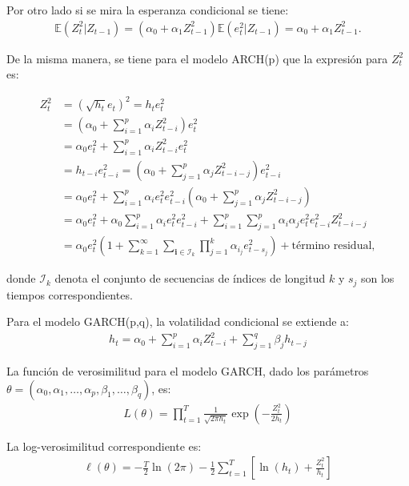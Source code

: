 Por otro lado si se mira la esperanza condicional se tiene:
\begin{align*}
    \mathbb{E}(Z_t^2|Z_{t-1})=(\alpha_0+\alpha_1Z^{2}_{t-1} )\mathbb{E}(e^{2}_t|Z_{t-1})=\alpha_0 +\alpha_1 Z_{t-1}^2.
\end{align*}

De la misma manera, se tiene para el modelo ARCH(p) que la expresión para $Z_t^2$ es:

\begin{align*}
    Z_t^2 &= \left(\sqrt{h_t} e_t\right)^2 = h_t e_t^2\\
    &= \left(\alpha_0 + \sum_{i=1}^{p} \alpha_i Z_{t-i}^2\right) e_t^2\\
    &= \alpha_0 e_t^2 + \sum_{i=1}^{p} \alpha_i Z_{t-i}^2 e_t^2\\
    &= h_{t-i} e_{t-i}^2 = \left(\alpha_0 + \sum_{j=1}^{p} \alpha_j Z_{t-i-j}^2\right) e_{t-i}^2\\
    &= \alpha_0 e_t^2 + \sum_{i=1}^{p} \alpha_i e_t^2 e_{t-i}^2 \left(\alpha_0 + \sum_{j=1}^{p} \alpha_j Z_{t-i-j}^2\right)\\
    &= \alpha_0 e_t^2 + \alpha_0 \sum_{i=1}^{p} \alpha_i e_t^2 e_{t-i}^2 + \sum_{i=1}^{p} \sum_{j=1}^{p} \alpha_i \alpha_j e_t^2 e_{t-i}^2 Z_{t-i-j}^2\\
    &= \alpha_0 e_t^2 \left(1 + \sum_{k=1}^{\infty} \sum_{\mathbf{i} \in \mathcal{I}_k} \prod_{j=1}^{k} \alpha_{i_j} e_{t-s_j}^2\right) + \text{término residual},
\end{align*}

donde $\mathcal{I}_k$ denota el conjunto de secuencias de índices de longitud $k$ y $s_j$ son los tiempos correspondientes.
\newline



Para el modelo GARCH(p,q), la volatilidad condicional se extiende a:
\begin{align*}
    h_t = \alpha_0 + \sum_{i=1}^{p} \alpha_i Z_{t-i}^2 + \sum_{j=1}^{q} \beta_j h_{t-j}
\end{align*}

La función de verosimilitud para el modelo GARCH, dado los parámetros $\theta = (\alpha_0, \alpha_1, \ldots, \alpha_p, \beta_1, \ldots, \beta_q)$, es:
\begin{align*}
    L(\theta) = \prod_{t=1}^{T} \frac{1}{\sqrt{2\pi h_t}} \exp\left(-\frac{Z_t^2}{2h_t}\right)
\end{align*}

La log-verosimilitud correspondiente es:
\begin{align*}
    \ell(\theta) = -\frac{T}{2}\ln(2\pi) - \frac{1}{2}\sum_{t=1}^{T}\left[\ln(h_t) + \frac{Z_t^2}{h_t}\right]
\end{align*} 